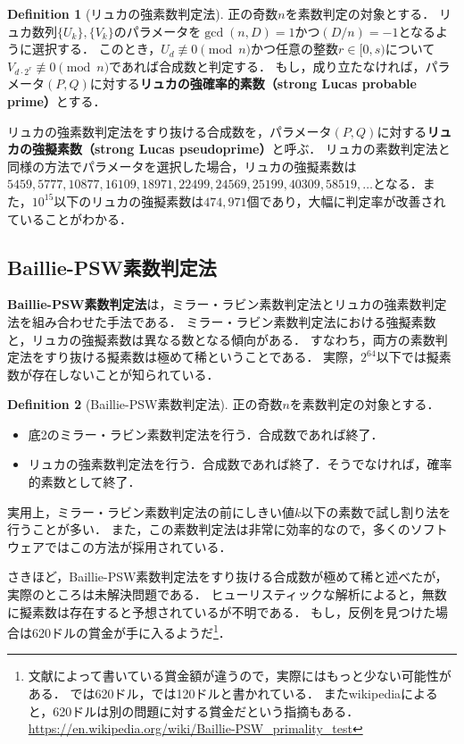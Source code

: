 \documentclass[uplatex]{jsarticle}
\theoremstyle{definition}
\newtheorem{dfn}{Definition}[section]
\begin{document}
\begin{dfn}[リュカの強素数判定法]
    正の奇数$n$を素数判定の対象とする．
    リュカ数列$\{U_k\}, \{V_k\}$のパラメータを$\gcd(n,D)=1$かつ$(D/n)=-1$となるように選択する．
    このとき，$U_d \not\equiv 0 \pmod{n}$かつ任意の整数$r\in[0,s)$について$V_{d \cdot 2^r} \not\equiv 0 \pmod{n}$であれば合成数と判定する．
    もし，成り立たなければ，パラメータ$(P,Q)$に対する\textbf{リュカの強確率的素数（strong Lucas probable prime）}とする．
\end{dfn}

リュカの強素数判定法をすり抜ける合成数を，パラメータ$(P,Q)$に対する\textbf{リュカの強擬素数（strong Lucas pseudoprime）}と呼ぶ．
リュカの素数判定法と同様の方法でパラメータを選択した場合，リュカの強擬素数は$5459, 5777, 10877, 16109,
 18971, 22499, 24569, 25199, 40309, 58519, \dots$となる．また，$10^{15}$以下のリュカの強擬素数は$474{,}971$個であり，大幅に判定率が改善されていることがわかる．

\subsection{Baillie-PSW素数判定法}

\textbf{Baillie-PSW素数判定法}は，ミラー・ラビン素数判定法とリュカの強素数判定法を組み合わせた手法である．
ミラー・ラビン素数判定法における強擬素数と，リュカの強擬素数は異なる数となる傾向がある．
すなわち，両方の素数判定法をすり抜ける擬素数は極めて稀ということである．
実際，$2^{64}$以下では擬素数が存在しないことが知られている．

\begin{dfn}[Baillie-PSW素数判定法]
    正の奇数$n$を素数判定の対象とする．
    \begin{itemize}
        \item 底2のミラー・ラビン素数判定法を行う．合成数であれば終了．
        \item リュカの強素数判定法を行う．合成数であれば終了．そうでなければ，確率的素数として終了．
    \end{itemize}
\end{dfn}

実用上，ミラー・ラビン素数判定法の前にしきい値$k$以下の素数で試し割り法を行うことが多い．
また，この素数判定法は非常に効率的なので，多くのソフトウェアではこの方法が採用されている\cite{albrecht2018prime}．

さきほど，Baillie-PSW素数判定法をすり抜ける合成数が極めて稀と述べたが，実際のところは未解決問題である．
ヒューリスティックな解析によると，無数に擬素数は存在すると予想されているが不明である\cite{pomerance1984there}．
もし，反例を見つけた場合は620ドルの賞金が手に入るようだ\footnote{
文献によって書いている賞金額が違うので，実際にはもっと少ない可能性がある．
\cite{baillie2021strengthening}では620ドル，\cite{pomerance1984there}では120ドルと書かれている．
またwikipediaによると，620ドルは別の問題に対する賞金だという指摘もある．
\\
\url{https://en.wikipedia.org/wiki/Baillie-PSW_primality_test}
}．



\end{document}
